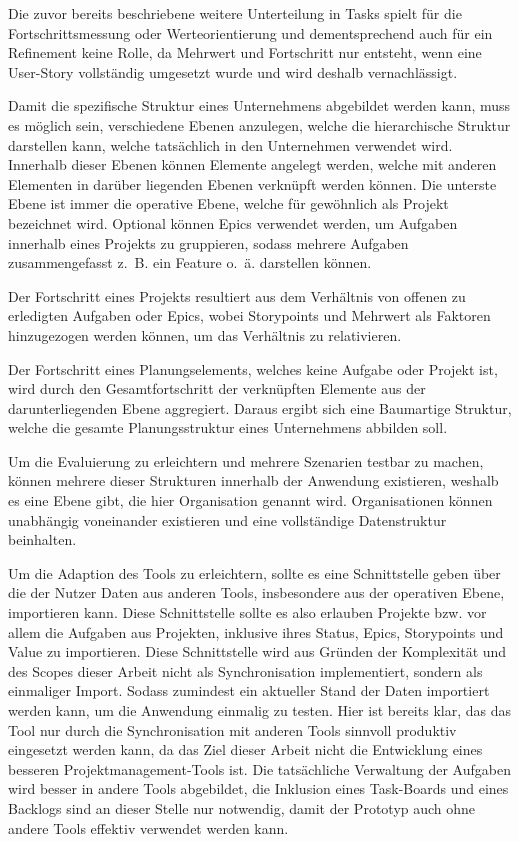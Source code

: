 Die zuvor bereits beschriebene weitere Unterteilung in Tasks spielt für die Fortschrittsmessung oder Werteorientierung und dementsprechend auch für ein Refinement keine Rolle, da Mehrwert und Fortschritt nur entsteht, wenn eine User-Story vollständig umgesetzt wurde und wird deshalb vernachlässigt.

Damit die spezifische Struktur eines Unternehmens abgebildet werden kann, muss es möglich sein, verschiedene Ebenen anzulegen, welche die hierarchische Struktur darstellen kann, welche tatsächlich in den Unternehmen verwendet wird. Innerhalb dieser Ebenen können Elemente angelegt werden, welche mit anderen Elementen in darüber liegenden Ebenen verknüpft werden können.
Die unterste Ebene ist immer die operative Ebene, welche für gewöhnlich als Projekt bezeichnet wird. Optional können Epics verwendet werden, um Aufgaben innerhalb eines Projekts zu gruppieren, sodass mehrere Aufgaben zusammengefasst z. B. ein Feature o. ä. darstellen können.

Der Fortschritt eines Projekts resultiert aus dem Verhältnis von offenen zu erledigten Aufgaben oder Epics, wobei Storypoints und Mehrwert als Faktoren hinzugezogen werden können, um das Verhältnis zu relativieren.

Der Fortschritt eines Planungselements, welches keine Aufgabe oder Projekt ist, wird durch den Gesamtfortschritt der verknüpften Elemente aus der darunterliegenden Ebene aggregiert. Daraus ergibt sich eine Baumartige Struktur, welche die gesamte Planungsstruktur eines Unternehmens abbilden soll.

Um die Evaluierung zu erleichtern und mehrere Szenarien testbar zu machen, können mehrere dieser Strukturen innerhalb der Anwendung existieren, weshalb es eine Ebene gibt, die hier Organisation genannt wird. Organisationen können unabhängig voneinander existieren und eine vollständige Datenstruktur beinhalten.

Um die Adaption des Tools zu erleichtern, sollte es eine Schnittstelle geben über die der Nutzer Daten aus anderen Tools, insbesondere aus der operativen Ebene, importieren kann.
Diese Schnittstelle sollte es also erlauben Projekte bzw. vor allem die Aufgaben aus Projekten, inklusive ihres Status, Epics, Storypoints und Value zu importieren. Diese Schnittstelle wird aus Gründen der Komplexität und des Scopes dieser Arbeit nicht als Synchronisation implementiert, sondern als einmaliger Import. Sodass zumindest ein aktueller Stand der Daten importiert werden kann, um die Anwendung einmalig zu testen. Hier ist bereits klar, das das Tool nur durch die Synchronisation mit anderen Tools sinnvoll produktiv eingesetzt werden kann, da das Ziel dieser Arbeit nicht die Entwicklung eines besseren Projektmanagement-Tools ist. Die tatsächliche Verwaltung der Aufgaben wird besser in andere Tools abgebildet, die Inklusion eines Task-Boards und eines Backlogs sind an dieser Stelle nur notwendig, damit der Prototyp auch ohne andere Tools effektiv verwendet werden kann.

